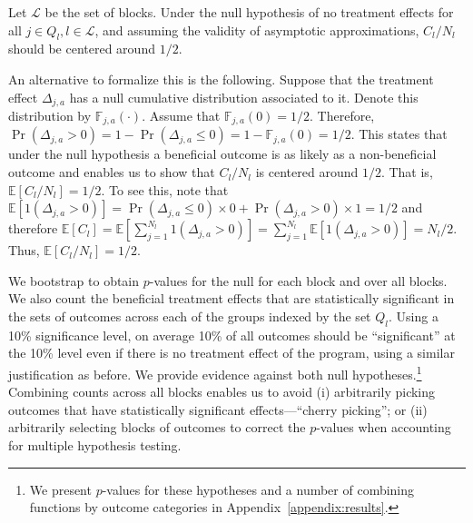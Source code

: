 Let $\mathcal{L}$ be the set of blocks. Under the null hypothesis of no treatment effects for all $j \in Q_l, l \in \mathcal{L}$, and assuming the validity of asymptotic approximations, $C_l / N_l$ should be centered around $1/2$.

An alternative to formalize this is the following. Suppose that the treatment effect $\Delta_{j,a}$ has a null cumulative distribution associated to it. Denote this distribution by $\mathbb{F}_{j,a} \left( \cdot \right)$. Assume that $\mathbb{F}_{j,a} \left( 0 \right) = 1/2$. Therefore, $\Pr \left( \Delta_{j,a} > 0 \right) = 1 - \Pr \left( \Delta_{j,a} \leq 0 \right) = 1 - \mathbb{F}_{j,a} \left( 0 \right) = 1/2$. This states that under the null hypothesis a beneficial outcome is as likely as a non-beneficial outcome and enables us to show that $C_{l}/N_{l}$ is centered around $1/2$. That is, $\mathbb{E} \left[ C_{l}/N_{l} \right] = 1/2$. To see this, note that $\mathbb{E}\left[ 1 ( \Delta_{j,a} >0)  \right] = \Pr \left( \Delta_{j,a} \leq 0 \right) \times 0  + \Pr \left( \Delta_{j,a} > 0 \right)  \times 1 = 1/2$ and therefore $\mathbb{E} \left[ C_{l}  \right] = \mathbb{E} \left[ \sum^{N_l}_{j=1} 1 (\Delta_{j,a} >0) \right] = \sum^{N_l}_{j=1} \mathbb{E}\left[ 1 ( \Delta_{j,a} >0)  \right] = N_{l}/2$. Thus, $\mathbb{E} \left[ C_{l}/N_{l} \right] = 1/2$.

We bootstrap to obtain $p$-values for the null for each block and over all blocks. We also count the beneficial treatment effects that are statistically significant in the sets of outcomes across each of the groups indexed by the set $Q_l$. Using a 10\% significance level, on average 10\% of all outcomes should be ``significant'' at the 10\% level even if there is no treatment effect of the program, using a similar justification as before. We provide evidence against both null hypotheses.\footnote{We present $p$-values for these hypotheses and a number of combining functions by outcome categories in Appendix~\ref{appendix:results}.} Combining counts across all blocks enables us to avoid (i) arbitrarily picking outcomes that have statistically significant effects---``cherry picking''; or (ii) arbitrarily selecting blocks of outcomes to correct the $p$-values when accounting for multiple hypothesis testing.

\pagebreak
\singlespace






